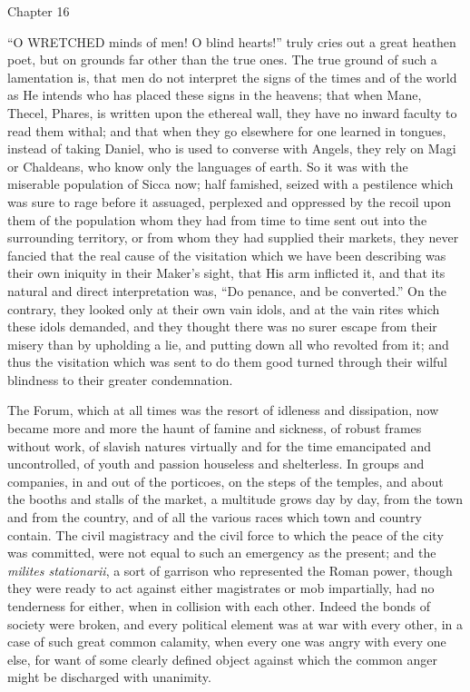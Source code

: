 Chapter 16


``O WRETCHED minds of men! O blind hearts!'' truly
cries out a great heathen poet, but on grounds far other than the true
ones. The true ground of such a lamentation is, that men do not
interpret the signs of the times and of the world as He intends who
has placed these signs in the heavens; that when Mane, Thecel, Phares,
is written upon the ethereal wall, they have no inward faculty to read
them withal; and that when they go elsewhere for one learned in
tongues, instead of taking Daniel, who is used to converse with
Angels, they rely on Magi or Chaldeans, who know only the languages of
earth. So it was with the miserable population of Sicca now; half
famished, seized with a pestilence which was sure to rage before it
assuaged, perplexed and oppressed by the recoil upon them of the
population whom they had from time to time sent out into the
surrounding territory, or from whom they had supplied their markets,
they never fancied that the real cause of the visitation which we have
been describing was their own iniquity in their Maker's sight, that
His arm inflicted it, and that its natural and direct interpretation was, ``Do penance, and be converted.'' On the
contrary, they looked only at their own vain idols, and at the vain
rites which these idols demanded, and they thought there was no surer
escape from their misery than by upholding a lie, and putting down all
who revolted from it; and thus the visitation which was sent to do
them good turned through their wilful blindness to their greater
condemnation.

The Forum, which at all times was the resort of idleness and
dissipation, now became more and more the haunt of famine and
sickness, of robust frames without work, of slavish natures virtually
and for the time emancipated and uncontrolled, of youth and passion
houseless and shelterless. In groups and companies, in and out of the
porticoes, on the steps of the temples, and about the booths and
stalls of the market, a multitude grows day by day, from the town and
from the country, and of all the various races which town and country
contain. The civil magistracy and the civil force to which the peace
of the city was committed, were not equal to such an emergency as the
present; and the \emph{milites stationarii}, a sort of garrison who
represented the Roman power, though they were ready to act against
either magistrates or mob impartially, had no tenderness for either,
when in collision with each other. Indeed the bonds of society were
broken, and every political element was at war with every other, in a
case of such great common calamity, when every one was angry with
every one else, for want of some clearly defined object against
which the common anger might be discharged with unanimity.

